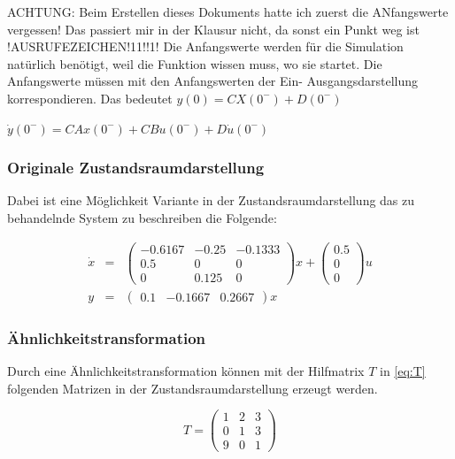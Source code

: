 ACHTUNG: Beim Erstellen dieses Dokuments hatte ich zuerst die ANfangswerte vergessen! Das passiert mir in der Klausur nicht, da sonst ein Punkt weg ist !AUSRUFEZEICHEN!11!!1!
Die Anfangswerte werden für die Simulation natürlich benötigt, weil die Funktion wissen muss, wo sie startet.
Die Anfangswerte müssen mit den Anfangswerten der Ein-  Ausgangsdarstellung korrespondieren. 
Das bedeutet $y(0) = CX(0^-) + D(0^-)$

$ \dot y(0^-) = CAx(0^-) + CBu(0^-) + D \dot u (0^-)$
















\subsubsection{Originale Zustandsraumdarstellung}

Dabei ist eine Möglichkeit Variante in der Zustandsraumdarstellung das zu behandelnde System zu beschreiben die Folgende:

\begin{eqnarray*}
    \dot x &=& \left(\begin{array}{ccc} -0.6167 & -0.25 & -0.1333\\ 0.5 & 0 & 0\\ 0 & 0.125 & 0 \end{array}\right) x + \left(\begin{array}{c} 0.5\\ 0\\ 0 \end{array}\right) u  \nonumber \\
    y &=& \left(\begin{array}{ccc} 0.1 & -0.1667 & 0.2667 \end{array}\right) x
\end{eqnarray*}

\subsubsection{Ähnlichkeitstransformation}

Durch eine Ähnlichkeitstransformation können mit der Hilfmatrix $T$ in \ref{eq:T} folgenden Matrizen in der Zustandsraumdarstellung erzeugt werden.

\begin{equation*}
    \label{eq:T}
    T = \left(\begin{array}{ccc} 1 & 2 & 3\\ 0 & 1 & 3\\ 9 & 0 & 1 \end{array}\right)
\end{equation*} 

